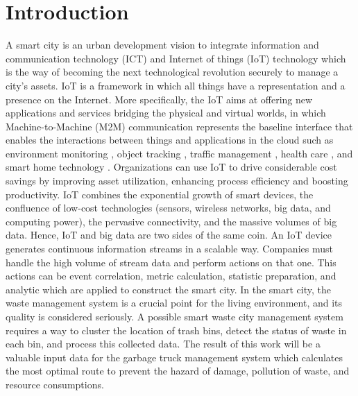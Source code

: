 \documentclass[conference]{IEEEtran}
\begin{document}
\section{Introduction}
A smart city is an urban development vision to integrate information and communication technology (ICT) and Internet of things (IoT) technology which is the way of becoming the next technological revolution \cite{Delicato2013} securely to manage a city's assets. IoT is a framework in which all things have a representation and a presence on the Internet. More specifically, the IoT aims at offering new applications and services bridging the physical and virtual worlds, in which Machine-to-Machine (M2M) communication represents the baseline interface that enables the interactions between things and applications in the cloud such as environment monitoring \cite{Lazarescu2013}\cite{Kelly2013}, object tracking \cite{Gama2012}, traffic management \cite{Foschini2011}, health care \cite{Jara2011}, and smart home technology \cite{Tozlu2012}\cite{Li2011}. Organizations can use IoT to drive considerable cost savings by improving asset utilization, enhancing process efficiency and boosting productivity. IoT combines the exponential growth of smart devices,  the confluence of low-cost technologies (sensors, wireless networks, big data, and computing power), the pervasive connectivity, and the massive volumes of big data. Hence, IoT and big data are two sides of the same coin. An IoT device generates continuous information streams in a scalable way. Companies must handle the high volume of stream data and perform actions on that one. This actions can be event correlation, metric calculation, statistic preparation, and analytic which are applied to construct the smart city. In the smart city, the waste management system is a crucial point for the living environment, and its quality is considered seriously. A possible smart waste city management system requires a way to cluster the location of trash bins, detect the status of waste in each bin, and process this collected data. The result of this work will be a valuable input data for the garbage truck management system which calculates the most optimal route to prevent the hazard of damage, pollution of waste, and resource consumptions. 
\end{document}
